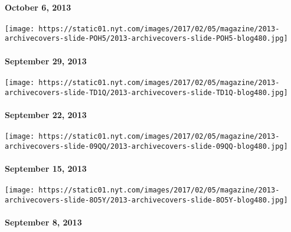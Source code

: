 \hypertarget{october-6-2013}{%
\paragraph{October 6, 2013}\label{october-6-2013}}

\href{http://www.nytimes.com/indexes/2013/09/29/magazine/index.html}{}

\texttt{[image: https://static01.nyt.com/images/2017/02/05/magazine/2013-archivecovers-slide-POH5/2013-archivecovers-slide-POH5-blog480.jpg]}

\hypertarget{september-29-2013}{%
\paragraph{September 29, 2013}\label{september-29-2013}}

\href{http://www.nytimes.com/indexes/2013/09/22/magazine/index.html}{}

\texttt{[image: https://static01.nyt.com/images/2017/02/05/magazine/2013-archivecovers-slide-TD1Q/2013-archivecovers-slide-TD1Q-blog480.jpg]}

\hypertarget{september-22-2013}{%
\paragraph{September 22, 2013}\label{september-22-2013}}

\href{http://www.nytimes.com/indexes/2013/09/15/magazine/index.html}{}

\texttt{[image: https://static01.nyt.com/images/2017/02/05/magazine/2013-archivecovers-slide-09QQ/2013-archivecovers-slide-09QQ-blog480.jpg]}

\hypertarget{september-15-2013}{%
\paragraph{September 15, 2013}\label{september-15-2013}}

\href{http://www.nytimes.com/indexes/2013/09/08/magazine/index.html}{}

\texttt{[image: https://static01.nyt.com/images/2017/02/05/magazine/2013-archivecovers-slide-8O5Y/2013-archivecovers-slide-8O5Y-blog480.jpg]}

\hypertarget{september-8-2013}{%
\paragraph{September 8, 2013}\label{september-8-2013}}

